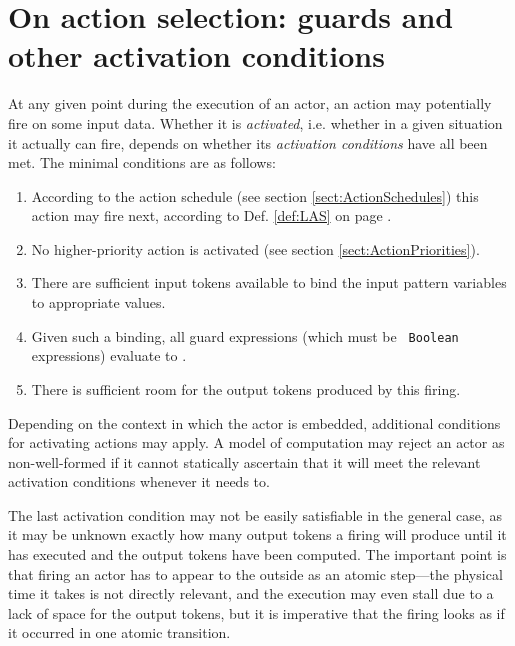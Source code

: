 


\section{On action selection: guards and other activation
  conditions}\label{sect:ActionSelection}



At any given point during the execution of an actor, an action may
potentially fire on some input data. Whether it is {\em activated},
i.e. whether in a given situation it
actually can fire, depends on whether its {\em activation conditions}
have all been met. The minimal conditions are as follows:
\begin{enumerate}
\item According to the action schedule (see section
  \ref{sect:ActionSchedules}) this action may fire next, according to
  Def. \ref{def:LAS} on page \pageref{def:LAS}.
\item No higher-priority action is activated (see section
  \ref{sect:ActionPriorities}).
\item There are sufficient input tokens available to bind the input
  pattern variables to appropriate values.
\item Given such a binding, all guard expressions (which must be {\tt
    Boolean} expressions) evaluate to \kwTrue.
\item There is sufficient room for the output tokens produced by this
  firing.
\end{enumerate}

Depending on the context in which the actor is embedded, additional
conditions for activating actions may apply. A model of computation
may reject an actor as non-well-formed if it cannot statically
ascertain that
it will meet the relevant activation conditions whenever it needs to.


\begin{implementation}
  The last activation condition may not be easily satisfiable in the
  general case, as it may be unknown exactly how many output tokens a
  firing will produce until it has executed and the output tokens have
  been computed. The important point is that firing an actor has to
  appear to the outside as an atomic step---the physical time it takes
  is not directly relevant, and the execution may even stall due to
  a lack of space for the output tokens, but it is imperative that the
  firing looks as if it occurred in one atomic transition.
\end{implementation}

